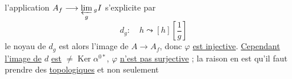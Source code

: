 l'application $A_f\longrightarrow\underset{g}{\varprojlim}\,{}_g I$ s'explicite par
\[
d_g:\quad h\leadsto [h]\left[\frac{1}{g}\right]
\]
le noyau de $d_g$ est alors l'image de $A\longrightarrow A_f$, donc $\varphi$ \uline{est injective}. \uline{Cependant l'image de} $d$ \uline{est} $\ne\operatorname{Ker}\alpha^{0\ast}$, $\varphi$ \uline{n'est pas surjective} ; la raison en est qu'il faut prendre des \uline{ topologiques} et non seulement

